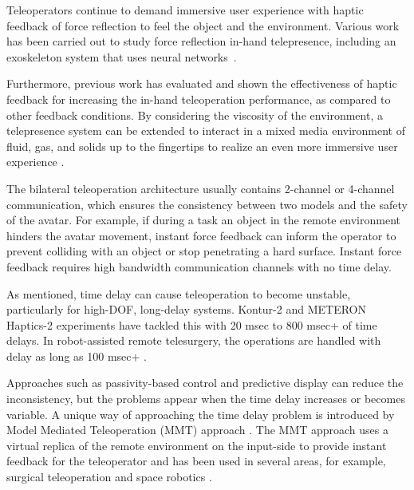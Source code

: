 \documentclass[letterpaper, 10 pt, conference]{ieeeconf}  %
\begin{document}
\noindent
Teleoperators continue to demand immersive user experience with haptic feedback of force reflection to feel the object and the environment. Various work has been carried out to study force reflection in-hand telepresence, including an exoskeleton system that uses neural networks~\cite{fischer1998learning}. 

\noindent
Furthermore, previous work \cite{dlr80501} has evaluated and shown the effectiveness of haptic feedback for increasing the in-hand teleoperation performance, as compared to other feedback conditions. By considering the viscosity of the environment, a telepresence system can be extended to interact in a mixed media environment of fluid, gas, and solids up to the fingertips to realize an even more immersive user experience \cite{mastersthesis_annika}. 

\noindent

\noindent
The bilateral teleoperation architecture usually contains 2-channel \cite{2_channel} or 4-channel \cite{4_channel} communication, which ensures the consistency between two models and the safety of the avatar.  
For example, if during a task an object in the remote environment hinders the avatar movement, instant force feedback can inform the operator to prevent colliding with an object or stop penetrating a hard surface. Instant force feedback requires high bandwidth communication channels with no time delay.

\noindent
As mentioned, time delay can cause teleoperation to become unstable, particularly for high-DOF, long-delay systems. Kontur-2 \cite{dlr112967} and METERON Haptics-2 experiments\cite{Haptics2} have tackled this with 20 msec to 800 msec+ of time delays. In robot-assisted remote telesurgery, the operations are handled with delay as long as 100 msec+ \cite{Telesurgery}.

\noindent
Approaches such as passivity-based control \cite{passivity1, passivity2, passivity4} and predictive display \cite{predictivediplay1, predictivedisplay2} can reduce the inconsistency, but the problems appear when the time delay increases or becomes variable. A unique way of approaching the time delay problem is introduced by Model Mediated Teleoperation (MMT) approach \cite{modelmediated1, Xu2016ModelMediatedTT}. The MMT approach uses a virtual replica of the remote environment on the input-side to provide instant feedback for the teleoperator and has been used in several areas, for example, surgical teleoperation \cite{SurgicalMMT} and space robotics \cite{SpaceMMT_DLR}.
\end{document}
